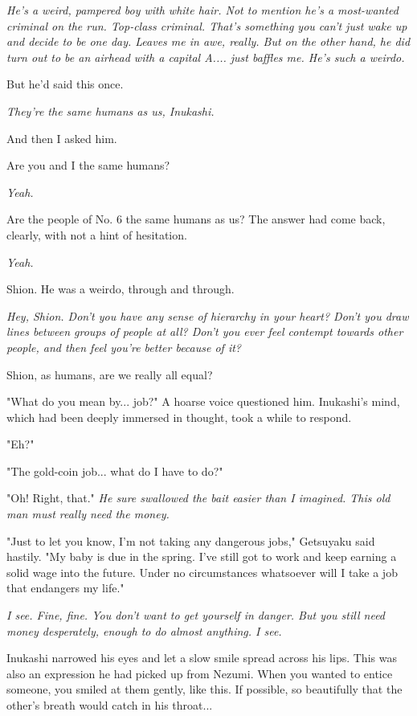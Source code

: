 \emph{He's a weird, pampered boy with white hair. Not to mention he's a
most-wanted criminal on the run. Top-class criminal. That's something
you can't just wake up and decide to be one day. Leaves me in awe,
really. But on the other hand, he did turn out to be an airhead with a
capital A.... just baffles me. He's such a weirdo.}

But he'd said this once.

\emph{They're the same humans as us, Inukashi.}

And then I asked him.

Are you and I the same humans?

\emph{Yeah.}

Are the people of No. 6 the same humans as us? The answer had come back,
clearly, with not a hint of hesitation.

\emph{Yeah.}

Shion. He was a weirdo, through and through.

\emph{Hey, Shion. Don't you have any sense of hierarchy in your heart? Don't
you draw lines between groups of people at all? Don't you ever feel
contempt towards other people, and then feel you're better because of
it?}

Shion, as humans, are we really all equal?

"What do you mean by... job?" A hoarse voice questioned him. Inukashi's
mind, which had been deeply immersed in thought, took a while to
respond.

"Eh?"

"The gold-coin job... what do I have to do?"

"Oh! Right, that." \emph{He sure swallowed the bait easier than I imagined.
This old man must really need the money.}

"Just to let you know, I'm not taking any dangerous jobs," Getsuyaku
said hastily. "My baby is due in the spring. I've still got to work and
keep earning a solid wage into the future. Under no circumstances
whatsoever will I take a job that endangers my life."

\emph{I see. Fine, fine. You don't want to get yourself in danger. But you
still need money desperately, enough to do almost anything. I see.}

Inukashi narrowed his eyes and let a slow smile spread across his lips.
This was also an expression he had picked up from Nezumi. When you
wanted to entice someone, you smiled at them gently, like this. If
possible, so beautifully that the other's breath would catch in his
throat...

